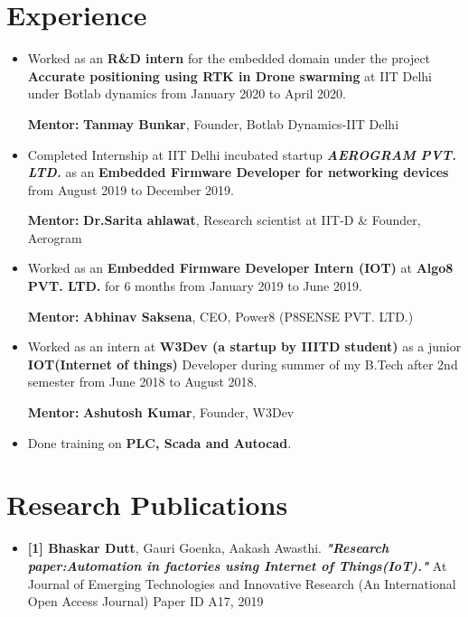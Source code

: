 \documentclass[10pt]{report}
\begin{document}
\section*{\color{BlueViolet}\faSuitcase\hspace{1pt} Experience} %
\begin{itemize}
\item{Worked as an \textbf{R\&D intern} for the embedded domain under the project \textbf{Accurate positioning using RTK in Drone swarming} at IIT Delhi under Botlab dynamics }from January 2020 to April 2020.

\hfill{\textbf{Mentor: }\textbf{Tanmay Bunkar}, Founder, Botlab Dynamics-IIT Delhi}
\item{Completed Internship at IIT Delhi incubated startup \textbf{\textit{AEROGRAM PVT. LTD.}} as an \textbf{Embedded Firmware Developer for networking devices} from August 2019 to December 2019.}

\hfill{\textbf{Mentor: }\textbf{Dr.Sarita ahlawat}, Research scientist at IIT-D \& Founder, Aerogram}
\item Worked as an \textbf{Embedded Firmware Developer Intern (IOT)} at \textbf{Algo8 PVT. LTD.}  for 6 months from January 2019 to June 2019.

\hfill{\textbf{Mentor: }\textbf{Abhinav Saksena}, CEO, Power8 (P8SENSE PVT. LTD.)}
\item Worked as an intern at \textbf{W3Dev (a startup by IIITD student)} as a junior \textbf{IOT(Internet of things)} Developer during summer of my B.Tech after 2nd semester from June 2018 to August 2018.

\hfill{\textbf{Mentor: }\textbf{Ashutosh Kumar}, Founder, W3Dev}
\item Done training on \textbf{PLC, Scada and Autocad}.
\end{itemize}

\section*{\color{BlueViolet}\faUniversity\hspace{1pt} Research Publications} %
\begin{itemize}
	\item \textbf{[1] Bhaskar Dutt}, Gauri Goenka, Aakash Awasthi. \textbf{\textit{"Research paper:Automation in factories using Internet of Things(IoT)."}} At Journal of Emerging Technologies and Innovative Research (An International Open Access Journal) Paper ID A17, 2019 %
\end{itemize}
\end{document}

